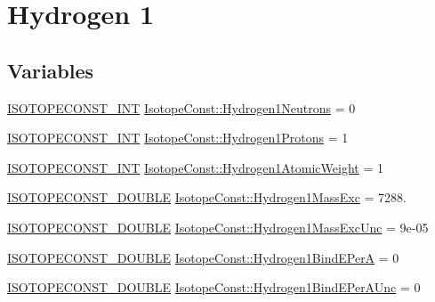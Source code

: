 \hypertarget{group___isotope_const-_hydrogen-_h1}{}\section{Hydrogen 1}
\label{group___isotope_const-_hydrogen-_h1}
\subsection*{Variables}
\begin{DoxyCompactItemize}
\item 
\mbox{\hyperlink{group___isotope_const-_macros_ga5f18360b3e99483a35c32d789e62621c}{I\+S\+O\+T\+O\+P\+E\+C\+O\+N\+S\+T\+\_\+\+I\+NT}} \mbox{\hyperlink{group___isotope_const-_hydrogen-_h1_ga67383724c2cdf9f6b6de255f72eee169}{Isotope\+Const\+::\+Hydrogen1\+Neutrons}} = 0
\item 
\mbox{\hyperlink{group___isotope_const-_macros_ga5f18360b3e99483a35c32d789e62621c}{I\+S\+O\+T\+O\+P\+E\+C\+O\+N\+S\+T\+\_\+\+I\+NT}} \mbox{\hyperlink{group___isotope_const-_hydrogen-_h1_ga3190f479a347bbc7a36db8cb989380ab}{Isotope\+Const\+::\+Hydrogen1\+Protons}} = 1
\item 
\mbox{\hyperlink{group___isotope_const-_macros_ga5f18360b3e99483a35c32d789e62621c}{I\+S\+O\+T\+O\+P\+E\+C\+O\+N\+S\+T\+\_\+\+I\+NT}} \mbox{\hyperlink{group___isotope_const-_hydrogen-_h1_gabd425e1807f636591385e3de882a99b7}{Isotope\+Const\+::\+Hydrogen1\+Atomic\+Weight}} = 1
\item 
\mbox{\hyperlink{group___isotope_const-_macros_ga8f45a7272ce02c0b4c65c44636ed719a}{I\+S\+O\+T\+O\+P\+E\+C\+O\+N\+S\+T\+\_\+\+D\+O\+U\+B\+LE}} \mbox{\hyperlink{group___isotope_const-_hydrogen-_h1_ga708b3bf4d57eb7ffa1f7bc1fd8918136}{Isotope\+Const\+::\+Hydrogen1\+Mass\+Exc}} = 7288.
\item 
\mbox{\hyperlink{group___isotope_const-_macros_ga8f45a7272ce02c0b4c65c44636ed719a}{I\+S\+O\+T\+O\+P\+E\+C\+O\+N\+S\+T\+\_\+\+D\+O\+U\+B\+LE}} \mbox{\hyperlink{group___isotope_const-_hydrogen-_h1_ga8928cca4d95b1357d15fa4abc01a71de}{Isotope\+Const\+::\+Hydrogen1\+Mass\+Exc\+Unc}} = 9e-\/05
\item 
\mbox{\hyperlink{group___isotope_const-_macros_ga8f45a7272ce02c0b4c65c44636ed719a}{I\+S\+O\+T\+O\+P\+E\+C\+O\+N\+S\+T\+\_\+\+D\+O\+U\+B\+LE}} \mbox{\hyperlink{group___isotope_const-_hydrogen-_h1_gaacab34ee57f19d8eb89f8b7c202d3341}{Isotope\+Const\+::\+Hydrogen1\+Bind\+E\+PerA}} = 0
\item 
\mbox{\hyperlink{group___isotope_const-_macros_ga8f45a7272ce02c0b4c65c44636ed719a}{I\+S\+O\+T\+O\+P\+E\+C\+O\+N\+S\+T\+\_\+\+D\+O\+U\+B\+LE}} \mbox{\hyperlink{group___isotope_const-_hydrogen-_h1_ga29a4cdf46aa0e542f62c434d7b9ca3d2}{Isotope\+Const\+::\+Hydrogen1\+Bind\+E\+Per\+A\+Unc}} = 0

\end{DoxyCompactItemize}
